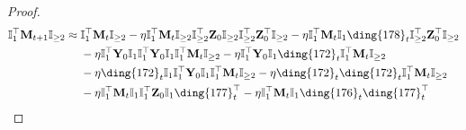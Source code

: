 \documentclass{article}
\theoremstyle{plain}
\theoremstyle{remark}
\def\bY{\mathbf{Y}}
\def\bZ{\mathbf{Z}}
\newcommand{\cc}[1]{\text{\ding{\number\numexpr#1 + 171\relax}}}
\begin{document}
\begin{proof}
    \begin{align*}
        \mathbb{I}_{1}^\top\mathbf{M}_{t+1} \mathbb{I}_{\ge2}
        &\approx
            \mathbb{I}_{1}^\top\mathbf{M}_{t}\mathbb{I}_{\ge2}
            - \eta\mathbb{I}_{1}^\top \mathbf{M}_{t} \mathbb{I}_{\ge 2}\mathbb{I}_{\ge 2}^\top \bZ_0 \mathbb{I}_{\ge 2}\mathbb{I}_{\ge2}^\top \bZ_0^\top\mathbb{I}_{\ge2} 
            - \eta\mathbb{I}_{1}^\top \mathbf{M}_{t} \mathbb{I}_{1}\cc{7}_t\mathbb{I}_{\ge2}^\top \bZ_0^\top\mathbb{I}_{\ge2} 
        \\
        &~~~~
            - \eta \mathbb{I}_1^\top \bY_0 \mathbb{I}_1\mathbb{I}_1^\top \bY_0\mathbb{I}_{1}\mathbb{I}_{1}^\top\mathbf{M}_{t} \mathbb{I}_{\ge 2}  
            - \eta \mathbb{I}_1^\top \bY_0 \mathbb{I}_1\cc{1}_t\mathbb{I}_{1}^\top\mathbf{M}_{t} \mathbb{I}_{\ge 2}
        \\
        &~~~~ 
            - \eta \cc{1}_t \mathbb{I}_1\mathbb{I}_1^\top \bY_0\mathbb{I}_{1}\mathbb{I}_{1}^\top\mathbf{M}_{t} \mathbb{I}_{\ge 2}  
            - \eta \cc{1}_t\cc{1}_t\mathbb{I}_{1}^\top\mathbf{M}_{t}\mathbb{I}_{\ge 2}
        \\
        &~~~~ 
            - \eta \mathbb{I}_{1}^\top\mathbf{M}_{t}\mathbb{I}_{1}\mathbb{I}_{1}^\top\bZ_0\mathbb{I}_1\cc{6}_t^\top 
            - \eta \mathbb{I}_{1}^\top\mathbf{M}_{t}\mathbb{I}_{1}\cc{5}_t\cc{6}_t^\top 

\end{align*}
\end{proof}
\end{document}
